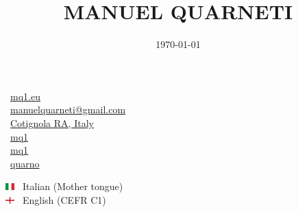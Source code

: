 \documentclass{article}
\title{\HUGE \textbf{MANUEL QUARNETI} \\[-20pt]}
\author{}
\date{\today}
\begin{document}
\setlength{\columnsep}{20pt}
\begin{paracol}{2}

\begin{tcolorbox}
    \vspace{10pt}

    \begin{center}
    \end{center}

    \vspace{0pt}

    \tcblower

    \faGlobe \ \href{https://mq1.eu/}{mq1.eu} \\
    \faEnvelope \ \href{mailto:manuelquarneti@gmail.com}{manuelquarneti@gmail.com} \\
    \faCity \ \href{https://www.openstreetmap.org/relation/43112}{Cotignola RA, Italy} \\
    \faGithub \ \href{https://github.com/mq1}{mq1} \\
    \faLinkedin \ \href{https://www.linkedin.com/in/mq1}{mq1} \\
    \faTelegram \ \href{https://t.me/quarno}{quarno}
\end{tcolorbox}

\vspace{45pt}

\begin{tcolorbox}[title=\faLanguage \ Languages]
    \includegraphics[width=10pt]{it} \ Italian (Mother tongue) \\
    \includegraphics[width=10pt]{gb-eng} \ English (CEFR C1)
\end{tcolorbox}


\end{paracol}
\end{document}
